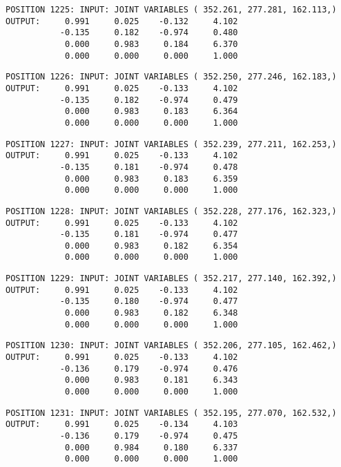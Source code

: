 \begin{verbatim}
POSITION 1225: INPUT: JOINT VARIABLES ( 352.261, 277.281, 162.113,)
OUTPUT:     0.991     0.025    -0.132     4.102
           -0.135     0.182    -0.974     0.480
            0.000     0.983     0.184     6.370
            0.000     0.000     0.000     1.000
\end{verbatim} \pagebreak[1]\begin{verbatim}
POSITION 1226: INPUT: JOINT VARIABLES ( 352.250, 277.246, 162.183,)
OUTPUT:     0.991     0.025    -0.133     4.102
           -0.135     0.182    -0.974     0.479
            0.000     0.983     0.183     6.364
            0.000     0.000     0.000     1.000
\end{verbatim} \pagebreak[1]\begin{verbatim}
POSITION 1227: INPUT: JOINT VARIABLES ( 352.239, 277.211, 162.253,)
OUTPUT:     0.991     0.025    -0.133     4.102
           -0.135     0.181    -0.974     0.478
            0.000     0.983     0.183     6.359
            0.000     0.000     0.000     1.000
\end{verbatim} \pagebreak[1]\begin{verbatim}
POSITION 1228: INPUT: JOINT VARIABLES ( 352.228, 277.176, 162.323,)
OUTPUT:     0.991     0.025    -0.133     4.102
           -0.135     0.181    -0.974     0.477
            0.000     0.983     0.182     6.354
            0.000     0.000     0.000     1.000
\end{verbatim} \pagebreak[1]\begin{verbatim}
POSITION 1229: INPUT: JOINT VARIABLES ( 352.217, 277.140, 162.392,)
OUTPUT:     0.991     0.025    -0.133     4.102
           -0.135     0.180    -0.974     0.477
            0.000     0.983     0.182     6.348
            0.000     0.000     0.000     1.000
\end{verbatim} \pagebreak[1]\begin{verbatim}
POSITION 1230: INPUT: JOINT VARIABLES ( 352.206, 277.105, 162.462,)
OUTPUT:     0.991     0.025    -0.133     4.102
           -0.136     0.179    -0.974     0.476
            0.000     0.983     0.181     6.343
            0.000     0.000     0.000     1.000
\end{verbatim} \pagebreak[1]\begin{verbatim}
POSITION 1231: INPUT: JOINT VARIABLES ( 352.195, 277.070, 162.532,)
OUTPUT:     0.991     0.025    -0.134     4.103
           -0.136     0.179    -0.974     0.475
            0.000     0.984     0.180     6.337
            0.000     0.000     0.000     1.000
\end{verbatim} \pagebreak[1]\begin{verbatim}

\end{verbatim}
